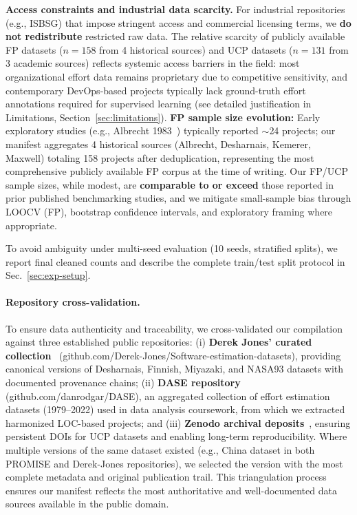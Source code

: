 \documentclass{ieeeaccess}
\begin{document}
\textbf{Access constraints and industrial data scarcity.} For industrial repositories (e.g., ISBSG\cite{isbsg2025overview}) that impose stringent access and commercial licensing terms, we \textbf{do not redistribute} restricted raw data. The relative scarcity of publicly available FP datasets ($n{=}158$ from 4 historical sources) and UCP datasets ($n{=}131$ from 3 academic sources) reflects systemic access barriers in the field: most organizational effort data remains proprietary due to competitive sensitivity, and contemporary DevOps-based projects typically lack ground-truth effort annotations required for supervised learning (see detailed justification in Limitations, Section~\ref{sec:limitations}). \textbf{FP sample size evolution:} Early exploratory studies (e.g., Albrecht 1983~\cite{albrecht1983software}) typically reported $\sim$24 projects; our manifest aggregates 4 historical sources (Albrecht, Desharnais, Kemerer, Maxwell) totaling 158 projects after deduplication, representing the most comprehensive publicly available FP corpus at the time of writing. Our FP/UCP sample sizes, while modest, are \textbf{comparable to or exceed} those reported in prior published benchmarking studies, and we mitigate small-sample bias through LOOCV (FP), bootstrap confidence intervals, and exploratory framing where appropriate.

To avoid ambiguity under multi-seed evaluation (10 seeds, stratified splits), we report final cleaned counts and describe the complete train/test split protocol in Sec.~\ref{sec:exp-setup}. 

\paragraph{Repository cross-validation.}
To ensure data authenticity and traceability, we cross-validated our compilation against three established public repositories: (i) \textbf{Derek Jones' curated collection}~\cite{jones2022estimation} (github.com/Derek-Jones/Software-estimation-datasets), providing canonical versions of Desharnais, Finnish, Miyazaki, and NASA93 datasets with documented provenance chains; (ii) \textbf{DASE repository}~\cite{rodriguez2023dase} (github.com/danrodgar/DASE), an aggregated collection of effort estimation datasets (1979--2022) used in data analysis coursework, from which we extracted harmonized LOC-based projects; and (iii) \textbf{Zenodo archival deposits}~\cite{huynh2023stacking,zenodo7022735}, ensuring persistent DOIs for UCP datasets and enabling long-term reproducibility. Where multiple versions of the same dataset existed (e.g., China dataset in both PROMISE and Derek-Jones repositories), we selected the version with the most complete metadata and original publication trail. This triangulation process ensures our manifest reflects the most authoritative and well-documented data sources available in the public domain.
\end{document}

